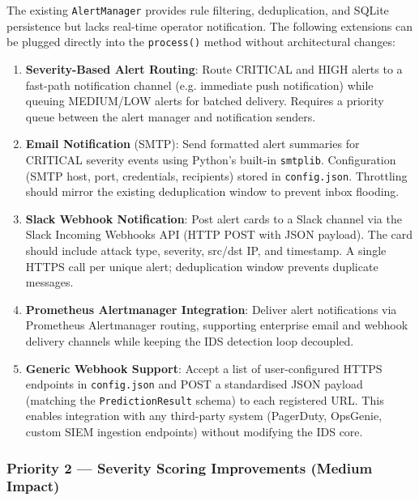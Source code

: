 \documentclass[12pt,a4paper]{article}
\begin{document}
The existing \texttt{AlertManager} provides rule filtering, deduplication, and SQLite persistence but lacks real-time operator notification. The following extensions can be plugged directly into the \texttt{process()} method without architectural changes:

\begin{enumerate}
    \item \textbf{Severity-Based Alert Routing}: Route CRITICAL and HIGH alerts to a fast-path notification channel (e.g. immediate push notification) while queuing MEDIUM/LOW alerts for batched delivery. Requires a priority queue between the alert manager and notification senders.

    \item \textbf{Email Notification} (SMTP): Send formatted alert summaries for CRITICAL severity events using Python's built-in \texttt{smtplib}. Configuration (SMTP host, port, credentials, recipients) stored in \texttt{config.json}. Throttling should mirror the existing deduplication window to prevent inbox flooding.

    \item \textbf{Slack Webhook Notification}: Post alert cards to a Slack channel via the Slack Incoming Webhooks API (HTTP POST with JSON payload). The card should include attack type, severity, src/dst IP, and timestamp. A single HTTPS call per unique alert; deduplication window prevents duplicate messages.

    \item \textbf{Prometheus Alertmanager Integration}: Deliver alert notifications via Prometheus Alertmanager routing, supporting enterprise email and webhook delivery channels while keeping the IDS detection loop decoupled.

    \item \textbf{Generic Webhook Support}: Accept a list of user-configured HTTPS endpoints in \texttt{config.json} and POST a standardised JSON payload (matching the \texttt{PredictionResult} schema) to each registered URL. This enables integration with any third-party system (PagerDuty, OpsGenie, custom SIEM ingestion endpoints) without modifying the IDS core.
\end{enumerate}

\subsubsection{Priority 2 — Severity Scoring Improvements (Medium Impact)}
\end{document}
